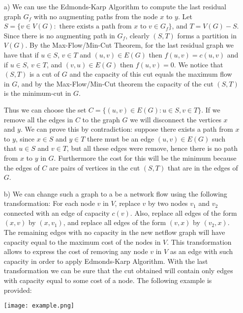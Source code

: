 \documentclass[a4paper, 11pt]{article}
\begin{document}
\begin{itemize}
	\item [a)] We can use the Edmonds-Karp Algorithm to compute the last residual graph $G_f$ with no augmenting paths from the node $x$ to $y$. Let $S = \{v \in V(G) : \text{ there exists a path from } x \text{ to } v \in G_f\}$, and $T = V(G) - S$. Since there is no augmenting path in $G_f$, clearly $(S, T)$ forms a partition in $V(G)$. By the Max-Flow/Min-Cut Theorem, for the last residual graph we have that if $u \in S$, $v \in T$ and $(u, v) \in E(G)$ then $f(u, v) = c(u, v)$ and if $u \in S$, $v \in T$, and $(v, u) \in E(G)$ then $f(u, v) = 0$. We notice that $(S, T)$ is a cut of $G$ and the capacity of this cut equals the maximum flow in $G$, and by the Max-Flow/Min-Cut theorem the capacity of the cut $(S, T)$ is the minimum-cut in $G$. 

	Thus we can choose the set $C = \{(u, v) \in E(G) : u \in S, v \in T\}$. If we remove all the edges in $C$ to the graph $G$ we will disconnect the vertices $x$ and $y$. We can prove this by contradiction: suppose there exists a path from $x$ to $y$, since $x \in S$ and $y \in T$ there must be an edge $(u, v) \in E(G)$ such that $u \in S$ and $v \in T$, but all these edges were remove, hence there is no path from $x$ to $y$ in $G$. Furthermore the cost for this will be the minimum because the edges of $C$ are pairs of vertices in the cut $(S,T)$ that are in the edges of $G$.
	
	\item [b)] We can change such a graph to a be a network flow using the following transformation: For each node $v$ in $V$, replace $v$ by two nodes $v_1$ and $v_2$ connected with an edge of capacity $c(v)$. Also, replace all edges of the form $(x, v)$ by $(x, v_1)$, and replace all edges of the form $(v, x)$ by $(v_2, x)$. The remaining edges with no capacity in the new netflow graph will have capacity equal to the maximum cost of the nodes in $V$. This transformation allows to express the cost of removing any node $v$ in $V$ as an edge with such capacity in order to apply Edmonds-Karp Algorithm. With the last transformation we can be sure that the cut obtained will contain only edges with capacity equal to some cost of a node. The following example is provided:

	\begin{center}
		\texttt{[image: example.png]}
	\end{center}	

\end{itemize}
\end{document}
